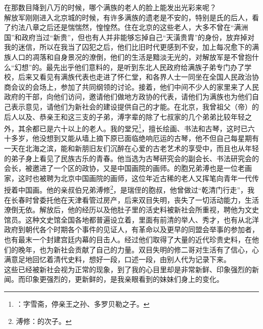 在那数目降到八万的时候，哪个满族的老人的脸上能发出光彩来呢？\\

解放军刚刚进入北京城的时候，有许多满族的遗老是不安的，特别是氏的后人，看了约法八章之后还是惴惴然，惶惶然。住在北京的这些老人，大多不曾在“满洲国”和政府当过“新贵”，但也有人并非能够忘掉自己“天潢贵胄”的身份，放弃掉对我的迷信，所以在我当了囚犯之后，他们比旧时代更感到不安，加上每况愈下的满族人口的凋落和自身景况的潦倒，他们的生活是黯淡无光的，对解放军是不曾抱什么“幻想”的。最先出乎他们意料的，是听到东北人民政府给满族子弟专门办了学校，后来又看见有满族代表也走进了怀仁堂，和各界人士一同坐在全国人民政治协商会议的会场上，参加了共同纲领的讨论。接着，他们中间不少人的家里来了人民政府的干部，向他们访问，邀请他们做地方政协的代表，请他们为满族也为他们自己表示意见，请他们为新社会的建设提供自己的才能。在北京，我曾祖父（帝）的后人以及、恭亲王和这三支的子弟，溥字辈的除了七叔家的几个弟弟比较年轻之外，其余都已是六十以上的老人。我的堂兄\footnote{：字雪斋，停亲王之孙、多罗贝勒之子。}，擅长绘画、书法和古琴，这时已六十多岁，他没想到又能从墙上摘下原已面临绝响厄运的古琴，他不但自己每星期有一天在北海之滨，能和新朋旧友们沉醉在心爱的古老艺术的享受中，而且也从年轻的弟子身上看见了民族古乐的青春。他当选为古琴研究会的副会长、书法研究会的会长，被邀进了一个区的政协，又是中国画院的画师。的胞兄弟溥也是一位老画家，这时也被聘为北京中国画院的画师，这位年近古稀的老人又挥笔向青年一代传授着中国画。他的亲叔伯兄弟溥修\footnote{溥修：的次子。}，是瑞侄的胞叔，他曾做过“乾清门行走”，我在长春时曾委托他在天津看管过房产，后来双目失明，丧失了一切活动能力，生活潦倒无依。解放后，他的经历以及他肚子里的活史料被新社会所重视，聘他为文史馆员。这种文史馆全国各地都普遍设立着，里面有前清的举人、秀才，也有从北洋政府到朝代各个时期各个事件的见证人，有革命以及更早的同盟会举事的参加者，也有最末一个封建宫廷内幕的目击人。经过他们取得了大量的近代珍贵史料，在他们的晚年，也为新社会贡献了自己的力量。双目失明的修二哥对生活有了信心，心满意足地回忆着清代史料，想好一段，口述一段，由别人代为记录下来。\\

这些已经被新社会视为正常的现象，到了我的心目里却是非常新鲜、印象强烈的新闻。而印象更强烈的，更新鲜的，是我亲眼看到的妹妹们身上的变化。\\

